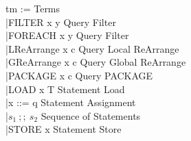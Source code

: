 \documentclass{article}
\begin{document}
\begin{frame}{}
\centering
	\begin{flushright}
	tm := \hfill \quad Terms \hfill \\
	\quad |FILTER \:x \:y \hfill Query Filter\hfill \\
   	\quad |FOREACH \:x \:y \hfill Query Filter \hfill \\
	\quad |LReArrange \:x \:c \hfill Query Local ReArrange\hfill \\
	\quad |GReArrange \:x \:c \hfill Query Global ReArrange\hfill \\
	\quad |PACKAGE \:x  \:c \hfill Query PACKAGE\hfill \\
	\quad |LOAD \:x \:T \hfill Statement Load\hfill \\
   	\quad |x ::= \:q \hfill Statement Assignment \hfill \\
   	\quad |$s_1 \:;; \:s_2$ \hfill Sequence of Statements \hfill \\
   	\quad |STORE \:x \hfill Statement Store \hfill \\
	\end{flushright}
\end{frame}
\end{document}
